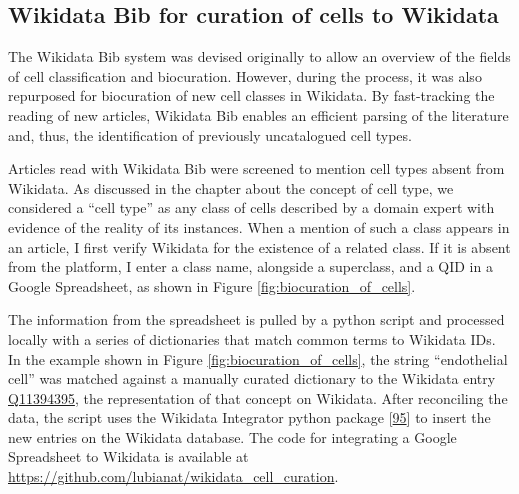 \hypertarget{wikidata-bib-for-curation-of-cells-to-wikidata}{%
\subsection{Wikidata Bib for curation of cells to Wikidata}\label{wikidata-bib-for-curation-of-cells-to-wikidata}}

The Wikidata Bib system was devised originally to allow an overview of the fields of cell classification and biocuration.
However, during the process, it was also repurposed for biocuration of new cell classes in Wikidata.
By fast-tracking the reading of new articles, Wikidata Bib enables an efficient parsing of the literature and, thus, the identification of previously uncatalogued cell types.

Articles read with Wikidata Bib were screened to mention cell types absent from Wikidata.
As discussed in the chapter about the concept of cell type, we considered a ``cell type'' as any class of cells described by a domain expert with evidence of the reality of its instances.
When a mention of such a class appears in an article, I first verify Wikidata for the existence of a related class.
If it is absent from the platform, I enter a class name, alongside a superclass, and a QID in a Google Spreadsheet, as shown in Figure \ref{fig:biocuration_of_cells}.

The information from the spreadsheet is pulled by a python script and processed locally with a series of dictionaries that match common terms to Wikidata IDs.
In the example shown in Figure \ref{fig:biocuration_of_cells}, the string ``endothelial cell'' was matched against a manually curated dictionary to the Wikidata entry \href{https://www.wikidata.org/wiki/Q11394395}{Q11394395}, the representation of that concept on Wikidata.
After reconciling the data, the script uses the Wikidata Integrator python package {[}\protect\hyperlink{ref-qDI8I4IJ}{95}{]} to insert the new entries on the Wikidata database.
The code for integrating a Google Spreadsheet to Wikidata is available at \url{https://github.com/lubianat/wikidata_cell_curation}.

